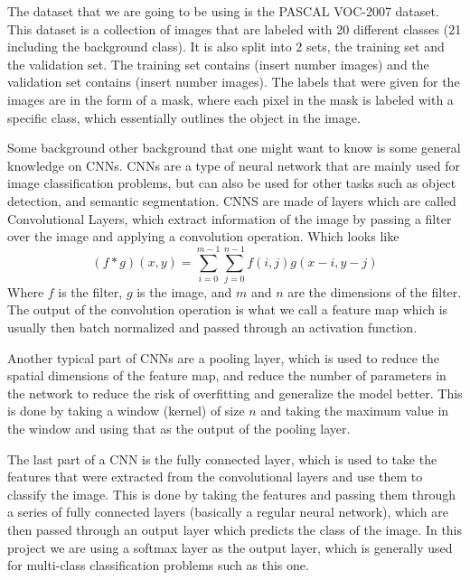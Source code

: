 \documentclass{article}
\begin{document}
The dataset that we are going to be using is the PASCAL VOC-2007 dataset. This dataset is a collection of images that are labeled with 20 different classes (21 including the background class). It is also split into 2 sets, the training set and the validation set. The training set contains (insert number images) and the validation set contains (insert number images). The labels that were given for the images are in the form of a mask, where each pixel in the mask is labeled with a specific class, which essentially outlines the object in the image.

Some background other background that one might want to know is some general knowledge on CNNs. CNNs are a type of neural network that are mainly used for image classification problems, but can also be used for other tasks such as object detection, and semantic segmentation. CNNS are made of layers which are called Convolutional Layers, which extract information of the image by passing a filter over the image and applying a convolution operation. Which looks like
\begin{equation}
  (f * g)(x, y) = \sum_{i=0}^{m-1} \sum_{j=0}^{n-1} f(i, j)g(x-i, y-j)
\end{equation}
Where $f$ is the filter, $g$ is the image, and $m$ and $n$ are the dimensions of the filter. The output of the convolution operation is what we call a feature map which is usually then batch normalized and passed through an activation function.

Another typical part of CNNs are a pooling layer, which is used to reduce the spatial dimensions of the feature map, and reduce the number of parameters in the network to reduce the risk of overfitting and generalize the model better. This is done by taking a window (kernel) of size $n$ and taking the maximum value in the window and using that as the output of the pooling layer.

The last part of a CNN is the fully connected layer, which is used to take the features that were extracted from the convolutional layers and use them to classify the image. This is done by taking the features and passing them through a series of fully connected layers (basically a regular neural network), which are then passed through an output layer which predicts the class of the image. In this project we are using a softmax layer as the output layer, which is generally used for multi-class classification problems such as this one.

\end{document}
